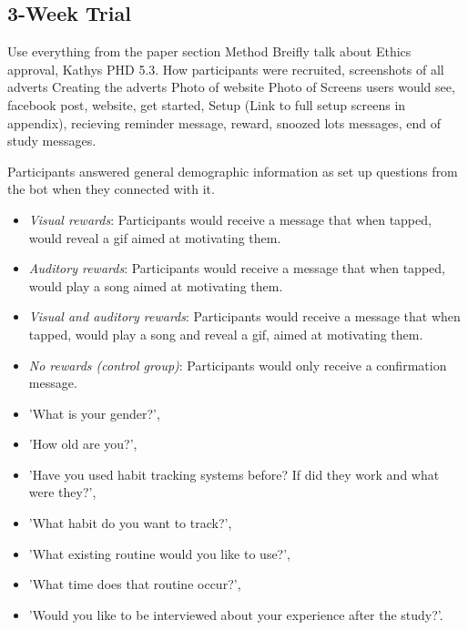 \subsection{3-Week Trial}

Use everything from the paper section Method\newline
\newline
Breifly talk about Ethics approval, Kathys PHD 5.3.\newline
How participants were recruited, screenshots of all adverts\newline
Creating the adverts\newline
Photo of website\newline
Photo of Screens users would see, facebook post, website, get started, Setup (Link to full setup screens in appendix), recieving reminder message, reward, snoozed lots messages, end of study messages.\newline

Participants answered general demographic information as set up questions from the bot when they connected with it.

\begin{itemize}
\item \textit{Visual rewards}: Participants would receive a message that when tapped, would reveal a gif aimed at motivating them.
\item \textit{Auditory rewards}: Participants would receive a message that when tapped, would play a song aimed at motivating them.
\item \textit{Visual and auditory rewards}: Participants would receive a message that when tapped, would play a song and reveal a gif, aimed at motivating them.
\item \textit{No rewards (control group)}: Participants would only receive a confirmation message.
\end{itemize}

\begin{itemize}
  \item 'What is your gender?',
    \item 'How old are you?',
    \item 'Have you used habit tracking systems before? If did they work and what were they?',
    \item 'What habit do you want to track?',
    \item 'What existing routine would you like to use?',
    \item 'What time does that routine occur?',
    \item 'Would you like to be interviewed about your experience after the study?'.
\end{itemize}

